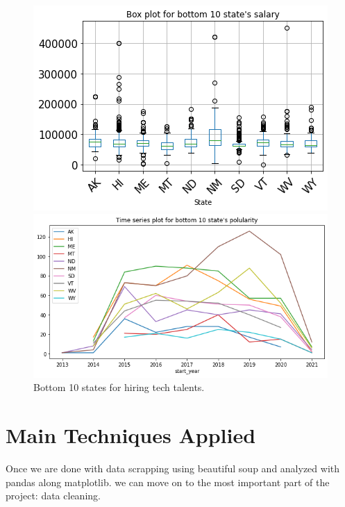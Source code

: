 \begin{figure}[h]
	
	\centering
	\begin{minipage}{.48\linewidth}
		\includegraphics[width=\linewidth]{./photos/bottom10statebox.png}


	\end{minipage}
	\hfill
	\begin{minipage}{.48\linewidth}
		\includegraphics[width=\linewidth]{./photos/bottom10statetime.png}


	\end{minipage}
\caption{Bottom 10 states for hiring tech talents.}
\label{leastpopular}
\end{figure}

\section{Main Techniques Applied}
Once we are  done with  data scrapping using beautiful soup and analyzed with pandas along matplotlib. we can move on to the most important part of the project: data cleaning.
